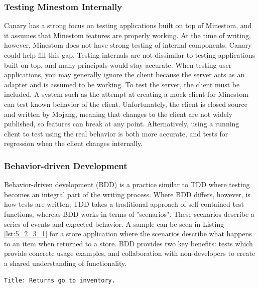 \documentclass[12pt]{article}
\begin{document}
\begin{onehalfspacing}
\subsubsection{Testing Minestom Internally}

Canary has a strong focus on testing applications built on top of
Minestom, and it assumes that Minestom features are properly working. At
the time of writing, however, Minestom does not have strong testing of
internal components. Canary could help fill this gap. Testing internals
are not dissimilar to testing applications built on top, and many
principals would stay accurate. When testing user applications, you may
generally ignore the client because the server acts as an adapter and is
assumed to be working. To test the server, the client must be included.
A system such as the attempt at creating a mock client for Minestom can
test known behavior of the client. Unfortunately, the client is closed
source and written by Mojang, meaning that changes to the client are not
widely published, so features can break at any point. Alternatively,
using a running client to test using the real behavior is both more
accurate, and tests for regression when the client changes internally.

\subsubsection{Behavior-driven Development}

Behavior-driven development (BDD) is a practice similar to TDD where
testing becomes an integral part of the writing process. Where BDD
differs, however, is how tests are written; TDD takes a traditional
approach of self-contained test functions, whereas BDD works in terms of
"scenarios". These scenarios describe a series of events and expected
behavior. A sample can be seen in Listing \ref{lst:5_2_3_1} for a store
application where the scenarios describe what happens to an item when
returned to a store. BDD provides two key benefits: tests which provide
concrete usage examples, and collaboration with non-developers to create
a shared understanding of functionality.



\begin{listing}[H]
\begin{verbatim}
Title: Returns go to inventory.


\end{verbatim}
\end{listing}
\end{onehalfspacing}
\end{document}
